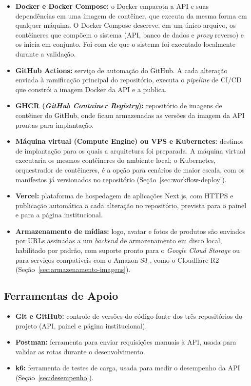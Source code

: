 \begin{itemize}
\item \textbf{Docker e Docker Compose:} o Docker empacota a API e suas dependências em uma imagem de contêiner, que executa da mesma forma em qualquer máquina. O Docker Compose descreve, em um único arquivo, os contêineres que compõem o sistema (API, banco de dados e \textit{proxy} reverso) e os inicia em conjunto. Foi com ele que o sistema foi executado localmente durante a validação.
\item \textbf{GitHub Actions:} serviço de automação do GitHub. A cada alteração enviada à ramificação principal do repositório, executa o \textit{pipeline} de CI/CD que constrói a imagem Docker da API e a publica.
\item \textbf{GHCR (\textit{GitHub Container Registry}):} repositório de imagens de contêiner do GitHub, onde ficam armazenadas as versões da imagem da API prontas para implantação.
\item \textbf{Máquina virtual (Compute Engine) ou VPS e Kubernetes:} destinos de implantação para os quais a arquitetura foi preparada. A máquina virtual executaria os mesmos contêineres do ambiente local; o Kubernetes, orquestrador de contêineres, é a opção para cenários de maior escala, com os manifestos já versionados no repositório (Seção~\ref{sec:workflow-deploy}).
\item \textbf{Vercel:} plataforma de hospedagem de aplicações Next.js, com HTTPS e publicação automática a cada alteração no repositório, prevista para o painel e para a página institucional.
\item \textbf{Armazenamento de mídias:} logo, avatar e fotos de produtos são enviados por URLs assinadas a um \textit{backend} de armazenamento em disco local, habilitado por padrão, com suporte pronto para o \textit{Google Cloud Storage} \cite{gcs-docs} ou para serviços compatíveis com o Amazon S3 \cite{s3-docs}, como o Cloudflare R2 \cite{r2-docs} (Seção~\ref{sec:armazenamento-imagens}).
\end{itemize}

\subsection{Ferramentas de Apoio}

\begin{itemize}
\item \textbf{Git e GitHub:} controle de versões do código-fonte dos três repositórios do projeto (API, painel e página institucional).
\item \textbf{Postman:} ferramenta para enviar requisições manuais à API, usada para validar as rotas durante o desenvolvimento.
\item \textbf{k6:} ferramenta de testes de carga, usada para medir o desempenho da API (Seção~\ref{sec:desempenho}).
\end{itemize}

